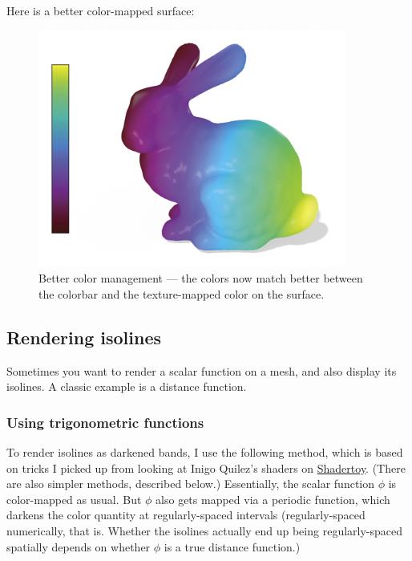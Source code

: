 \documentclass[10pt]{article}
\begin{document}
Here is a better color-mapped surface:
\begin{figure}[H]
    \centering
    \captionsetup{width=0.8\textwidth}
    \includegraphics[width=4in]{images/better-color-management.png}
    \caption{Better color management --- the colors now match better between the colorbar and the texture-mapped color on the surface.}
\end{figure}

\subsection{Rendering isolines}
Sometimes you want to render a scalar function on a mesh, and also display its isolines. A classic example is a distance function.

\subsubsection{Using trigonometric functions}
To render isolines as darkened bands, I use the following method, which is based on tricks I picked up from looking at Inigo Quilez's shaders on \href{shadertoy.com}{Shadertoy}. (There are also simpler methods, described below.) Essentially, the scalar function $\phi$ is color-mapped as usual. But $\phi$ also gets mapped via a periodic function, which darkens the color quantity at regularly-spaced intervals (regularly-spaced numerically, that is. Whether the isolines actually end up being regularly-spaced spatially depends on whether $\phi$ is a true distance function.)
\end{document}
